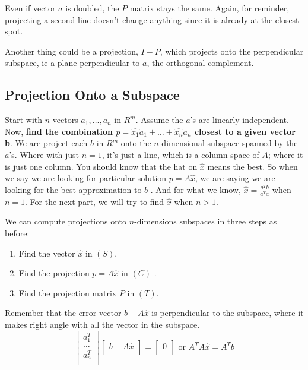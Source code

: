 Even if vector \(a\) is doubled, the \(P\) matrix stays the same. Again, for reminder, projecting a second line doesn't change anything since it is already at the closest spot. 

Another thing could be a projection, \(I - P\), which projects onto the perpendicular subspace, ie a plane perpendicular to \(a\), the orthogonal complement.

\subsection{Projection Onto a Subspace}

Start with \(n\) vectors \(a_1, \ldots, a_n\) in \(R^m\). Assume the \(a\)'s are linearly independent. 
Now, \textbf{find the combination \(p = \hat{x_1}a_1 + \ldots + \hat{x_n}a_n\) closest to a given vector b}. We are project each \(b\) in \(R^m\) onto the \(n\)-dimensional subspace spanned by the \(a\)'s. Where with just \(n = 1\), it's just a line, which is a column space of \(A\); where it is just one column. You should know that the hat on \(\hat{x}\) means the best. So when we say we are looking for particular solution \(p = A\hat{x}\), we are saying we are looking for the best approximation to \(b\) . And for what we know, \(\hat{x} = \frac{a^{T}b}{a^{T}a}\) when \(n = 1\). For the next part, we will try to find \(\hat{x}\)  when \(n > 1\). 

We can compute projections onto \(n\)-dimensions subspaces in three steps as before:
\begin{enumerate}
    \item Find the vector \(\hat{x}\) in \((S)\). 
    \item Find the projection \(p = A\hat{x}\) in \((C)\) .
    \item Find the projection matrix \(P\) in \((T)\). 
\end{enumerate} 

Remember that the error vector \(b - A\hat{x}\) is perpendicular to the subspace, where it makes right angle with all the vector in the subspace. 
\[
    \begin{bmatrix}
         a^T_1 \\
         \ldots \\
         a^T_n \\
    \end{bmatrix}
    \begin{bmatrix}
        b - A\hat{x} \\
    \end{bmatrix}
    = 
    \begin{bmatrix}
         0 \\
    \end{bmatrix}
    \text{ or }
    A^{T}A\hat{x} = A^{T}b
\] 

